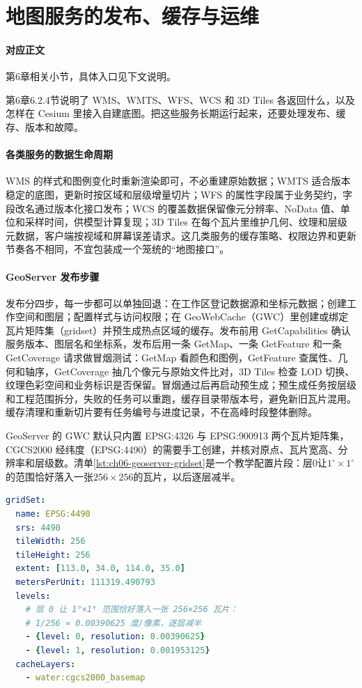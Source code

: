 \section{地图服务的发布、缓存与运维}\label{app:ext-ch06-gis-ops}

\paragraph{对应正文}第6章相关小节，具体入口见下文说明。

第6章6.2.4节说明了 WMS、WMTS、WFS、WCS 和 3D Tiles 各返回什么，以及怎样在 Cesium 里接入自建底图。把这些服务长期运行起来，还要处理发布、缓存、版本和故障。

\paragraph{各类服务的数据生命周期}WMS 的样式和图例变化时重新渲染即可，不必重建原始数据；WMTS 适合版本稳定的底图，更新时按区域和层级增量切片；WFS 的属性字段属于业务契约，字段改名通过版本化接口发布；WCS 的覆盖数据保留像元分辨率、NoData 值、单位和采样时间，供模型计算复现；3D Tiles 在每个瓦片里维护几何、纹理和层级元数据，客户端按视域和屏幕误差请求。这几类服务的缓存策略、权限边界和更新节奏各不相同，不宜包装成一个笼统的“地图接口”。

\paragraph{GeoServer 发布步骤}发布分四步，每一步都可以单独回退：在工作区登记数据源和坐标元数据；创建工作空间和图层；配置样式与访问权限；在 GeoWebCache（GWC）里创建或绑定瓦片矩阵集（gridset）并预生成热点区域的缓存。发布前用 GetCapabilities 确认服务版本、图层名和坐标系，发布后用一条 GetMap、一条 GetFeature 和一条 GetCoverage 请求做冒烟测试：GetMap 看颜色和图例，GetFeature 查属性、几何和轴序，GetCoverage 抽几个像元与原始文件比对，3D Tiles 检查 LOD 切换、纹理色彩空间和业务标识是否保留。冒烟通过后再启动预生成；预生成任务按层级和工程范围拆分，失败的任务可以重跑，缓存目录带版本号，避免新旧瓦片混用。缓存清理和重新切片要有任务编号与进度记录，不在高峰时段整体删除。

GeoServer 的 GWC 默认只内置 EPSG:4326 与 EPSG:900913 两个瓦片矩阵集，CGCS2000 经纬度（EPSG:4490）的需要手工创建，并核对原点、瓦片宽高、分辨率和层级数。清单\ref{lst:ch06-geoserver-gridset}是一个教学配置片段：层0让$1^\circ\times1^\circ$的范围恰好落入一张$256\times256$的瓦片，以后逐层减半。

\begin{lstlisting}[label={lst:ch06-geoserver-gridset},language=YAML,breaklines=true,caption={GeoServer GWC EPSG:4490 gridset配置要点}]
gridSet:
  name: EPSG:4490
  srs: 4490
  tileWidth: 256
  tileHeight: 256
  extent: [113.0, 34.0, 114.0, 35.0]
  metersPerUnit: 111319.490793
  levels:
    # 层 0 让 1°×1° 范围恰好落入一张 256×256 瓦片：
    # 1/256 ≈ 0.00390625 度/像素，逐层减半
    - {level: 0, resolution: 0.00390625}
    - {level: 1, resolution: 0.001953125}
  cacheLayers:
    - water:cgcs2000_basemap
\end{lstlisting}

